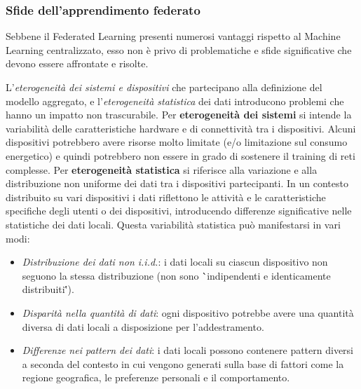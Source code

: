 \documentclass[a4paper, oneside, openright]{report}
\begin{document}
\subsubsection*{Sfide dell'apprendimento federato} 

Sebbene il Federated Learning presenti numerosi vantaggi rispetto al Machine Learning centralizzato, esso non è privo di problematiche e sfide significative che devono essere affrontate e risolte. 

L'\textit{eterogeneità dei sistemi e dispositivi} che partecipano alla definizione del modello aggregato, e l'\textit{eterogeneità statistica} dei dati introducono problemi che hanno un impatto non trascurabile. Per  \textbf{eterogeneità dei sistemi} si intende la variabilità delle caratteristiche hardware e di connettività tra i dispositivi. Alcuni dispositivi potrebbero avere risorse molto limitate (e/o limitazione sul consumo energetico) e quindi potrebbero non essere in grado di sostenere il training di reti complesse. Per \textbf{eterogeneità statistica} si riferisce alla variazione e alla distribuzione non uniforme dei dati tra i dispositivi partecipanti. In un contesto distribuito su vari dispositivi i dati riflettono le attività e le caratteristiche specifiche degli utenti o dei dispositivi, introducendo differenze significative nelle statistiche dei dati locali. Questa variabilità statistica può manifestarsi in vari modi:

\begin{itemize}
\item \textit{Distribuzione dei dati non i.i.d.}: i dati locali su ciascun dispositivo non seguono la stessa distribuzione (non sono \``indipendenti e identicamente distribuiti\''). 
\item \textit{Disparità nella quantità di dati}: ogni dispositivo potrebbe avere una quantità diversa di dati locali a disposizione per l'addestramento. 
\item \textit{Differenze nei pattern dei dati}: i dati locali possono contenere pattern diversi a seconda del contesto in cui vengono generati sulla base di fattori come la regione geografica, le preferenze personali e il comportamento.
\end{itemize}
\end{document}
